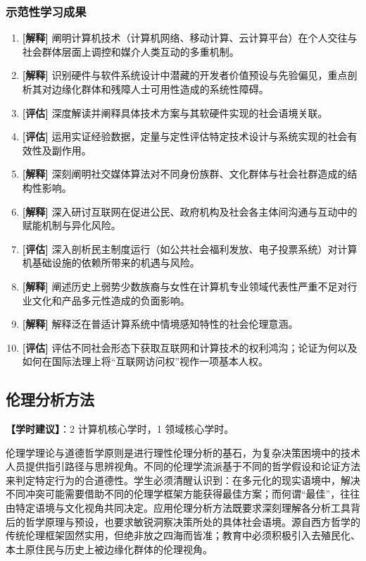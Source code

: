 \subsubsection{示范性学习成果}
\begin{enumerate}
    \item \textbf{[解释]} 阐明计算机技术（计算机网络、移动计算、云计算平台）在个人交往与社会群体层面上调控和媒介人类互动的多重机制。
    \item \textbf{[解释]} 识别硬件与软件系统设计中潜藏的开发者价值预设与先验偏见，重点剖析其对边缘化群体和残障人士可用性造成的系统性障碍。
    \item \textbf{[评估]} 深度解读并阐释具体技术方案与其软硬件实现的社会语境关联。
    \item \textbf{[评估]} 运用实证经验数据，定量与定性评估特定技术设计与系统实现的社会有效性及副作用。
    \item \textbf{[解释]} 深刻阐明社交媒体算法对不同身份族群、文化群体与社会社群造成的结构性影响。
    \item \textbf{[解释]} 深入研讨互联网在促进公民、政府机构及社会各主体间沟通与互动中的赋能机制与异化风险。
    \item \textbf{[评估]} 深入剖析民主制度运行（如公共社会福利发放、电子投票系统）对计算机基础设施的依赖所带来的机遇与风险。
    \item \textbf{[解释]} 阐述历史上弱势少数族裔与女性在计算机专业领域代表性严重不足对行业文化和产品多元性造成的负面影响。
    \item \textbf{[解释]} 解释泛在普适计算系统中情境感知特性的社会伦理意涵。
    \item \textbf{[评估]} 评估不同社会形态下获取互联网和计算技术的权利鸿沟；论证为何以及如何在国际法理上将“互联网访问权”视作一项基本人权。
\end{enumerate}

\subsection{伦理分析方法}
\textbf{【学时建议】}：2 计算机核心学时，1 领域核心学时。

伦理学理论与道德哲学原则是进行理性伦理分析的基石，为复杂决策困境中的技术人员提供指引路径与思辨视角。不同的伦理学流派基于不同的哲学假设和论证方法来判定特定行为的合道德性。学生必须清醒认识到：在多元化的现实语境中，解决不同冲突可能需要借助不同的伦理学框架方能获得最佳方案；而何谓“最佳”，往往由特定语境与文化视角共同决定。应用伦理分析方法既要求深刻理解各分析工具背后的哲学原理与预设，也要求敏锐洞察决策所处的具体社会语境。源自西方哲学的传统伦理框架固然实用，但绝非放之四海而皆准；教育中必须积极引入去殖民化、本土原住民与历史上被边缘化群体的伦理视角。

